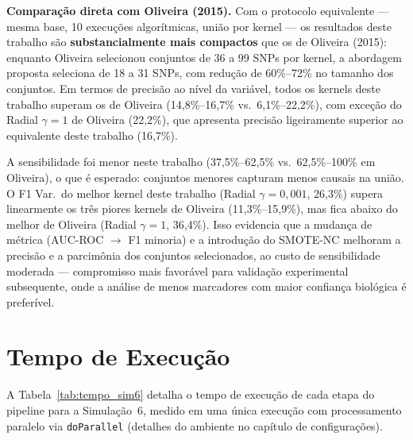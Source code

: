 \documentclass[
    12pt,
    a4paper,
    oneside,
    english,
    french,
    spanish,
    brazil
    ]{abntex2}
\newcommand{\novo}[1]{\textcolor{corNova}{#1}}
\begin{document}
\novo{\textbf{Comparação direta com Oliveira (2015).}
Com o protocolo equivalente --- mesma base, 10 execuções algorítmicas, união por kernel --- os resultados deste trabalho são \textbf{substancialmente mais compactos} que os de Oliveira (2015): enquanto Oliveira selecionou conjuntos de 36 a 99 SNPs por kernel, a abordagem proposta seleciona de 18 a 31 SNPs, com redução de 60\%--72\% no tamanho dos conjuntos. Em termos de precisão ao nível da variável, todos os kernels deste trabalho superam os de Oliveira (14,8\%--16,7\% vs.\ 6,1\%--22,2\%), com exceção do Radial $\gamma=1$ de Oliveira (22,2\%), que apresenta precisão ligeiramente superior ao equivalente deste trabalho (16,7\%).}

\novo{A sensibilidade foi menor neste trabalho (37,5\%--62,5\% vs.\ 62,5\%--100\% em Oliveira), o que é esperado: conjuntos menores capturam menos causais na união. O F1 Var.\ do melhor kernel deste trabalho (Radial $\gamma=0{,}001$, 26,3\%) supera linearmente os três piores kernels de Oliveira (11,3\%--15,9\%), mas fica abaixo do melhor de Oliveira (Radial $\gamma=1$, 36,4\%). Isso evidencia que a mudança de métrica (AUC-ROC $\to$ F1 minoria) e a introdução do SMOTE-NC melhoram a precisão e a parcimônia dos conjuntos selecionados, ao custo de sensibilidade moderada --- compromisso mais favorável para validação experimental subsequente, onde a análise de menos marcadores com maior confiança biológica é preferível.}

\section*{Tempo de Execução}

\novo{A Tabela~\ref{tab:tempo_sim6} detalha o tempo de execução de cada etapa do pipeline para a Simulação~6, medido em uma única execução com processamento paralelo via \texttt{doParallel} (detalhes do ambiente no capítulo de configurações).}
\end{document}
